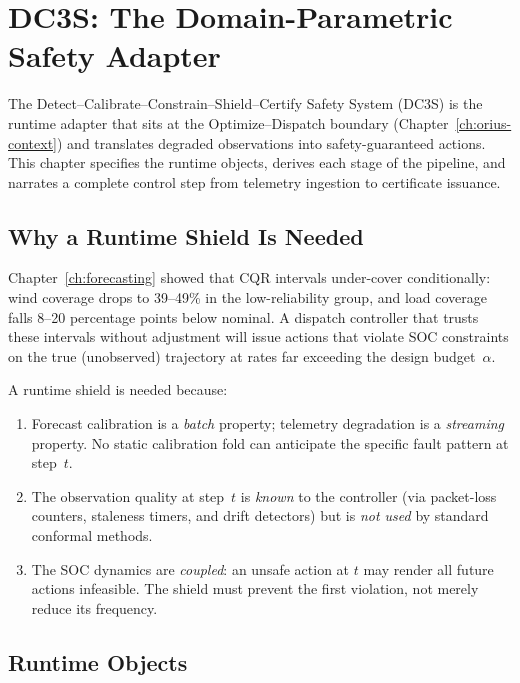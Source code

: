 
\chapter{DC3S: The Domain-Parametric Safety Adapter}
\label{ch:dc3s-adapter}
\label{ch:dc3s}

The Detect--Calibrate--Constrain--Shield--Certify Safety System (DC3S) is the
runtime adapter that sits at the Optimize--Dispatch boundary
(Chapter~\ref{ch:orius-context}) and translates degraded observations
into safety-guaranteed actions.  This chapter specifies the runtime objects,
derives each stage of the pipeline, and narrates a complete control step from
telemetry ingestion to certificate issuance.

\section{Why a Runtime Shield Is Needed}

Chapter~\ref{ch:forecasting} showed that CQR intervals under-cover
conditionally: wind coverage drops to 39--49\% in the low-reliability group,
and load coverage falls 8--20 percentage points below nominal.  A dispatch
controller that trusts these intervals without adjustment will issue actions
that violate SOC constraints on the true (unobserved) trajectory at rates far
exceeding the design budget~$\alpha$.

A runtime shield is needed because:
\begin{enumerate}
  \item Forecast calibration is a \emph{batch} property; telemetry degradation
    is a \emph{streaming} property.  No static calibration fold can anticipate
    the specific fault pattern at step~$t$.
  \item The observation quality at step~$t$ is \emph{known} to the controller
    (via packet-loss counters, staleness timers, and drift detectors) but is
    \emph{not used} by standard conformal methods.
  \item The SOC dynamics are \emph{coupled}: an unsafe action at $t$ may
    render all future actions infeasible.  The shield must prevent the
    first violation, not merely reduce its frequency.
\end{enumerate}

\section{Runtime Objects}
\label{sec:runtime-objects}

